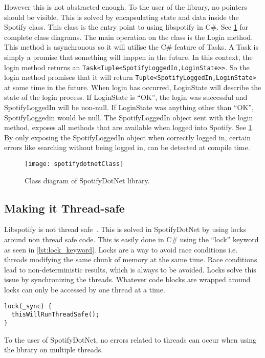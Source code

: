 However this is not abstracted enough. To the user of the library, no pointers should be visible. This is solved by encapsulating state and data inside the Spotify class. This class is the entry point to using libspotify in C\#. See \cref{fig:spotifydotnet_class} for complete class diagrams. The main operation on the class is the Login method. This method is asynchronous so it will utilise the C\# feature of Tasks. A Task is simply a promise that something will happen in the future. In this context, the login method returns an \lstinline|Task<Tuple<SpotifyLoggedIn,LoginState>>|. So the login method promises that it will return \lstinline|Tuple<SpotifyLoggedIn,LoginState>| at some time in the future. When login has occurred, LoginState will describe the state of the login process. If LoginState is \enquote{OK}, the login was successful and SpotifyLoggedIn will be non-null. If LoginState was anything other than \enquote{OK}, SpotifyLoggedin would be null. The SpotifyLoggedIn object sent with the login method, exposes all methods that are available when logged into Spotify. See \cref{fig:spotifydotnet_class}. By only exposing the SpotifyLoggedIn object when correctly logged in, certain errors like searching without being logged in, can be detected at compile time.

\begin{figure}[hbtp]
  \centering
  \texttt{[image: spotifydotnetClass]}
  \caption{Class diagram of SpotifyDotNet library.}
  \label{fig:spotifydotnet_class}
\end{figure}

\subsection{Making it Thread-safe}
\label{libspotify:making_it_thread_safe}

Libspotify is not thread safe~\cite{spotifyLibspotifyFAQ}. This is solved in SpotifyDotNet by using locks around non thread safe code. This is easily done in C\# using the \enquote{lock} keyword as seen in \cref{lst:lock_keyword}. Locks are a way to avoid race conditions i.e. threads modifying the same chunk of memory at the same time. Race conditions lead to non-deterministic results, which is always to be avoided. Locks solve this issue by synchronizing the threads. Whatever code blocks are wrapped around locks can only be accessed by one thread at a time.

\begin{lstlisting}[float, floatplacement=htpb, caption = {Example of using the lock keyword in C\#. \enquote{\_sync} is an object used to store the lock state}, label = {lst:lock_keyword}]
lock(_sync) {
  thisWillRunThreadSafe();
}
\end{lstlisting}

To the user of SpotifyDotNet, no errors related to threads can occur when using the library on multiple threads.
